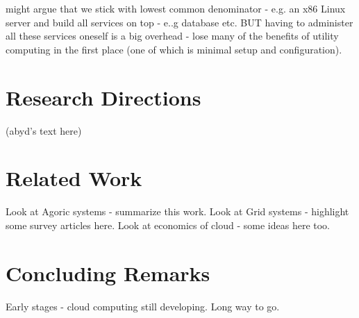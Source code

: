 \documentclass[conference,10pt]{IEEEtran}
\begin{document}
might argue that we stick with lowest common denominator - e.g. an x86 Linux server and build all services on top - e..g database etc. BUT having to administer all these services oneself is a big overhead - lose many of the benefits of utility computing in the first place (one of which is minimal setup and configuration).


\section{Research Directions}

(abyd's text here)

\section{Related Work}

Look at Agoric systems - summarize this work.
Look at Grid systems - highlight some survey articles here.
Look at economics of cloud - some ideas here too.

\section{Concluding Remarks}

Early stages - cloud computing still developing. Long way to go.
\end{document}
